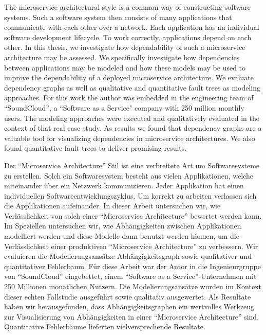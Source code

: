 
\newenvironment{tabstract}{
  \vspace*{\fill}
  \begin{center}%
    \bfseries\abstractname
  \end{center}
  }%
  {\vfill}

\pagebreak
\pagebreak

\begin{tabstract}
The microservice architectural style is a common way of constructing software systems. Such a software system then consists of many applications that communicate with each other over a network. Each application has an individual software development lifecycle. To work correctly, applications depend on each other. In this thesis, we investigate how dependability of such a microservice architecture may be assessed. We specifically investigate how dependencies between applications may be modeled and how these models may be used to improve the dependability of a deployed microservice architecture. We evaluate dependency graphs as well as qualitative and quantitative fault trees as modeling approaches. For this work the author was embedded in the engineering team of ``SoundCloud'', a ``Software as a Service" company with 250 million monthly users. The modeling approaches were executed and qualitatively evaluated in the context of that real case study. As results we found that dependency graphs are a valuable tool for visualizing dependencies in microservice architectures. We also found quantitative fault trees to deliver promising results.
\end{tabstract}

\pagebreak

\begin{tabstract}
Der ``Microservice Architecture'' Stil ist eine verbreitete Art um Softwaresysteme zu erstellen. Solch ein Softwaresystem besteht aus vielen Applikationen, welche miteinander über ein Netzwerk kommunizieren. Jeder Applikation hat einen individuellen Softwareentwicklungszyklus. Um korrekt zu arbeiten verlassen sich die Applikationen aufeinander. In dieser Arbeit untersuchen wir, wie Verlässlichkeit von solch einer ``Microservice Architecture'' bewertet werden kann. Im Speziellen untersuchen wir, wie Abhängigkeiten zwischen Applikationen modelliert werden und diese Modelle dann benutzt werden können, um die Verlässlichkeit einer produktiven ``Microservice Architecture'' zu verbessern. Wir evaluieren die Modelierungsansätze Abhängigkeitsgraph sowie qualitativer und quantitativer Fehlerbaum. Für diese Arbeit war der Autor in die Ingenieurgruppe von ``SoundCloud'' eingebettet, einem ``Software as a Service''-Unternehmen mit 250 Millionen monatlichen Nutzern. Die Modelierungsansätze wurden im Kontext dieser echten Fallstudie ausgeführt sowie qualitativ ausgewertet. Als Resultate haben wir herausgefunden, dass Abhängigkeitsgraphen ein wertvolles Werkzeug zur Visualisierung von Abhängigkeiten in einer ``Microservice Architecture'' sind. Quantitative Fehlerbäume lieferten vielversprechende Resultate.
\end{tabstract}

